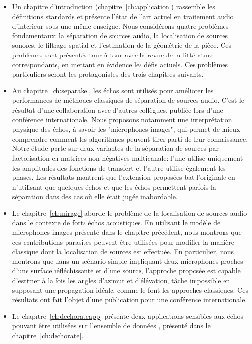 \begin{itemize}
    \item
    Un chapitre d'introduction (chapitre~\ref{ch:application}) rassemble les définitions standards et présente l'état de l'art actuel en traitement audio d'intérieur sous une même enseigne.
    Nous considérons quatre problèmes fondamentaux: la séparation de sources audio, la localisation de sources sonores, le filtrage spatial et l'estimation de la géométrie de la pièce.
    Ces problèmes sont présentés tour à tour avec la revue de la littérature correspondante, en mettant en évidence les défis actuels.
    Ces problèmes particuliers seront les protagonistes des trois chapitres suivants.
    \item
    Au chapitre~\ref{ch:separake}, les échos sont utilisés pour améliorer les performances de méthodes classiques de séparation de sources audio.
    C'est le résultat d'une collaboration avec d'autres collègues, publiée lors d'une conférence internationale.
    Nous proposons notamment une interprétation physique des échos, à savoir les "microphones-images", qui permet de mieux comprendre comment les algorithmes peuvent tirer parti de leur connaissance.
    Notre étude porte sur deux variantes de la séparation de sources par factorisation en matrices non-négatives multicanale:
    l'une utilise uniquement les amplitudes des fonctions de transfert et l'autre utilise également les phases.
    Les résultats montrent que l'extension proposées bat l'originale en n'utilisant que quelques échos et que les échos permettent parfois la séparation dans des cas où elle était jugée inabordable.
    \item
    Le chapitre~\ref{ch:mirage} aborde le problème de la localisation de sources audio dans le contexte de forts échos acoustiques.
    En utilisant le modèle de microphones-images présenté dans le chapitre précédent, nous montrons que ces contributions parasites peuvent être utilisées pour modifier la manière classique dont la localisation de sources est effectuée.
    En particulier, nous montrons que dans un scénario simple impliquant deux microphones proches d'une surface réfléchissante et d'une source, l'approche proposée est capable d'estimer à la fois les angles d'azimut et d'élévation, tâche impossible en supposant une propagation idéale, comme le font les approches classiques.
    Ces résultats ont fait l'objet d'une publication pour une conférence internationale.
    \item
    Le chapitre~\ref{ch:dechorateapp} présente deux applications sensibles aux échos pouvant être utilisées sur l'ensemble de données \dEchorate, présenté dans le chapitre~\ref{ch:dechorate}.

\end{itemize}
